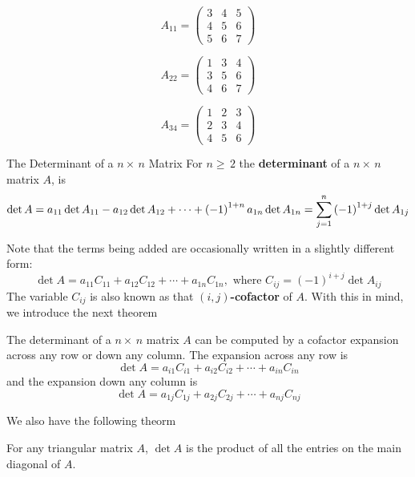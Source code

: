 \begin{minipage}{0.3\linewidth}
    \[
        A_{11} = \begin{pmatrix}
            3 & 4 & 5 \\
            4 & 5 & 6 \\
            5 & 6 & 7
        \end{pmatrix}
    \]    
\end{minipage}
\hfill
\begin{minipage}{0.3\linewidth}
    \[
        A_{22} = \begin{pmatrix}
            1 & 3 & 4 \\
            3 & 5 & 6 \\
            4 & 6 & 7
        \end{pmatrix}
    \]
\end{minipage}
\hfill
\begin{minipage}{0.3\linewidth}
   \[
        A_{34} = \begin{pmatrix}
            1 & 2 & 3 \\
            2 & 3 & 4 \\
            4 & 5 & 6
        \end{pmatrix}
   \] 
\end{minipage}

\begin{defbox}{The Determinant of a $n\times\,n$ Matrix}{}
    For $n\geq\,2$ the \textbf{determinant} of a $n\times\,n$ matrix $A$, is 
    \[\det{A} = a_{11}\det{A_{11}} - a_{12}\det{A_{12}} + \cdots + \left(-1\right)^{1+n}a_{1n}\det{A_{1n}} \\ = \sum_{j=1}^{n} \left(-1\right)^{1+j}\det{A_{1j}}\]
\end{defbox}

Note that the terms being added are occasionally written in a slightly different form: 
\[
    \det{A} = a_{11}C_{11} + a_{12}C_{12} + \cdots + a_{1n}C_{1n}, \text{ where } C_{ij} = \left(-1\right)^{i+j}\det{A_{ij}}
\]
The variable $C_{ij}$ is also known as that \textbf{$(i, j)$-cofactor} of $A$. With this in mind, we introduce the next theorem

\begin{thm}{}{}
    The determinant of a $n\times\,n$ matrix $A$ can be computed by a cofactor expansion across any row or down any column. The expansion across any row is 
    \[\det{A} = a_{i1}C_{i1} + a_{i2}C_{i2} + \cdots + a_{in}C_{in}\]
    and the expansion down any column is
    \[\det{A} = a_{1j}C_{1j} + a_{2j}C_{2j} + \cdots + a_{nj}C_{nj}\]
\end{thm}

We also have the following theorm 

\begin{thm}{}{}
    For any triangular matrix $A$, $\det{A}$ is the product of all the entries on the main diagonal of $A$. 
\end{thm}